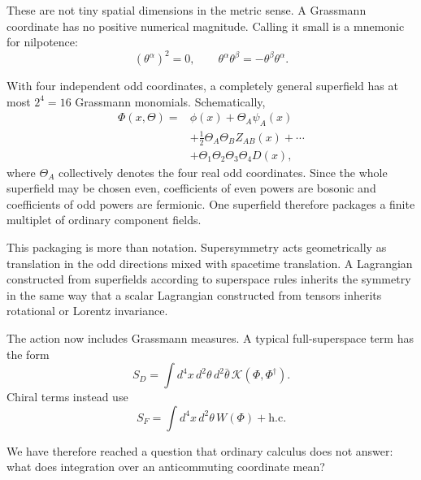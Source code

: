 These are not tiny spatial dimensions in the metric sense. A Grassmann coordinate has no positive numerical magnitude. Calling it small is a mnemonic for nilpotence:
\begin{equation}
(\theta^\alpha)^2=0,
\qquad
\theta^\alpha\theta^\beta=-\theta^\beta\theta^\alpha.
\end{equation}

With four independent odd coordinates, a completely general superfield has at most \(2^4=16\) Grassmann monomials. Schematically,
\begin{equation}
\begin{aligned}
\Phi(x,\Theta)={}&\phi(x)+\Theta_A\psi_A(x)\\
&+\frac{1}{2}\Theta_A\Theta_B Z_{AB}(x)+\cdots\\
&+\Theta_1\Theta_2\Theta_3\Theta_4D(x),
\end{aligned}
\end{equation}
where \(\Theta_A\) collectively denotes the four real odd coordinates. Since the whole superfield may be chosen even, coefficients of even powers are bosonic and coefficients of odd powers are fermionic. One superfield therefore packages a finite multiplet of ordinary component fields.

This packaging is more than notation. Supersymmetry acts geometrically as translation in the odd directions mixed with spacetime translation. A Lagrangian constructed from superfields according to superspace rules inherits the symmetry in the same way that a scalar Lagrangian constructed from tensors inherits rotational or Lorentz invariance.

The action now includes Grassmann measures. A typical full-superspace term has the form
\begin{equation}
S_D=\int d^4x\,d^2\theta\,d^2\bar\theta\,
\mathcal K(\Phi,\Phi^\dagger).
\end{equation}
Chiral terms instead use
\begin{equation}
S_F=\int d^4x\,d^2\theta\,W(\Phi)+\mathrm{h.c.}
\end{equation}

We have therefore reached a question that ordinary calculus does not answer: what does integration over an anticommuting coordinate mean?

